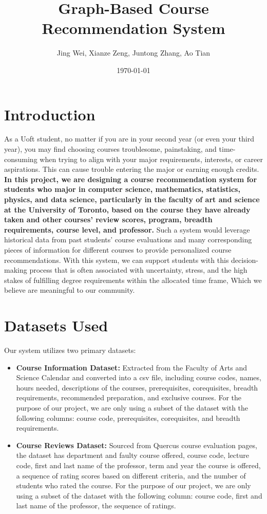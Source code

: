 \documentclass[fontsize=11pt]{article}
\title{Graph-Based Course Recommendation System}
\author{Jing Wei, Xianze Zeng, Juntong Zhang, Ao Tian}
\date{\today}
\begin{document}
\maketitle

\section*{Introduction}
As a Uoft student, no matter if you are in your second year (or even your third year), you may find choosing courses troublesome, painstaking, and time-consuming when trying to align with your major requirements, interests, or career aspirations. This can cause trouble entering the major or earning enough credits. \textbf{In this project, we are designing a course recommendation system for students who major in computer science, mathematics, statistics, physics, and data science, particularly in the faculty of art and science at the University of Toronto, based on the course they have already taken and other courses' review scores, program, breadth requirements, course level, and professor.} Such a system would leverage historical data from past students' course evaluations and many corresponding pieces of information for different courses to provide personalized course recommendations. With this system, we can support students with this decision-making process that is often associated with uncertainty, stress, and the high stakes of fulfilling degree requirements within the allocated time frame, Which we believe are meaningful to our community.

\section*{Datasets Used}
Our system utilizes two primary datasets:
\begin{itemize}
    \item \textbf{Course Information Dataset:} Extracted from the Faculty of Arts and Science Calendar and converted into a csv file, including course codes, names, hours needed, descriptions of the courses, prerequisites, corequisites, breadth requirements, recommended preparation, and exclusive courses. For the purpose of our project, we are only using a subset of the dataset with the following columns: course code, prerequisites, corequisites, and breadth requirements.
    \item \textbf{Course Reviews Dataset:} Sourced from Quercus course evaluation pages, the dataset has department and faulty course offered, course code, lecture code, first and last name of the professor, term and year the course is offered, a sequence of rating scores based on different criteria, and the number of students who rated the course. For the purpose of our project, we are only using a subset of the dataset with the following column: course code, first and last name of the professor, the sequence of ratings.
\end{itemize}
\end{document}
